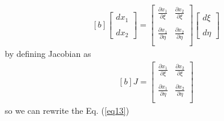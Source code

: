 \documentclass[]{article}
\begin{document}
\begin{equation}\label{eq14}
	\begin{aligned}[b]
		\begin{bmatrix}
			dx_{1}\\
			\\
			dx_{2}  
		\end{bmatrix}
		= \begin{bmatrix}
			\frac{\partial x_{1}}{\partial \xi}       & \frac{\partial x_{2}}{\partial \xi} \\
			\\
			\frac{\partial x_{1}}{\partial \eta}       &\frac{\partial x_{2}}{\partial \eta}\\
		\end{bmatrix}
		\begin{bmatrix}
			d \xi\\
			\\
			d \eta
		\end{bmatrix}
	\end{aligned}
\end{equation}
%
by defining Jacobian as
\begin{equation}\label{eq15}
	\begin{aligned}[b]
		J = \begin{bmatrix}
			\frac{\partial x_{1}}{\partial \xi}       & \frac{\partial x_{2}}{\partial \xi} \\
			\\
			\frac{\partial x_{1}}{\partial \eta}       &\frac{\partial x_{2}}{\partial \eta}\\
			\end{bmatrix}
	\end{aligned}
\end{equation}
so we can rewrite the Eq. (\ref{eq13})
\end{document}
